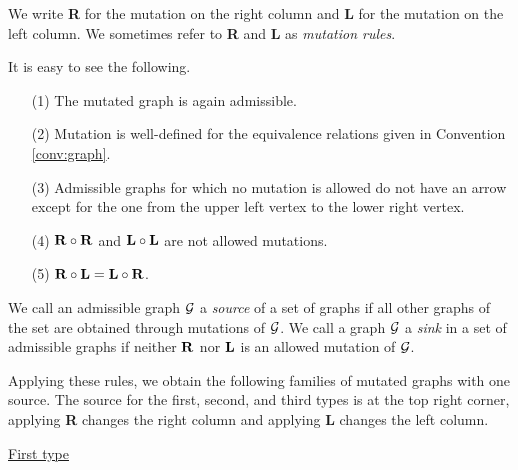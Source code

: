 \medskip
We write {\bf R} for the mutation on the right column and {\bf L}  for the mutation on the left column.  
We sometimes refer to {\bf R} and {\bf L}
 as {\it{mutation rules}}.  

It is easy to see the following.  

\begin{lemma}
\begin{enumerate}
\item[{\rm{(1)}}] The mutated graph is again admissible.  
\item[{\rm{(2)}}] Mutation is well-defined for the equivalence relations
 given in Convention \ref{conv:graph}.  
\item[{\rm{(3)}}] Admissible graphs 
 for which no mutation is allowed
 do not have an arrow except for the one from the upper left vertex to the lower right vertex. 
\item[{\rm{(4)}}]  $\bf R \circ R $ and $\bf L \circ L$ are not allowed mutations. 
\item[{\rm{(5)}}]
 $\bf R \circ L= L \circ R$.
\end{enumerate}
\end{lemma}

\begin{definition}
We call an admissible graph $\cal G$ a
 {\it{source}} of a set of graphs
 if all other  graphs of the set are obtained through mutations of $\cal G$.
We call a graph $\cal G$ a
 {\it{sink}} in a set of admissible graphs
 if neither $\bf R$ nor $\bf L$ is an allowed mutation of $\cal G$.
\end{definition}



Applying these rules,
 we obtain the following families of mutated graphs with one source. 
The source for the first,
 second, and third types is at the top right corner,
 applying {\bf R} changes the right column
 and applying {\bf L}  changes the left column.

\underline{First type} 

\def\Longdownarrow{\rotatebox[origin=c]{90}{$\Longleftarrow$}}
\def\Longuparrow{\rotatebox[origin=c]{90}{$\Longrightarrow$}}

